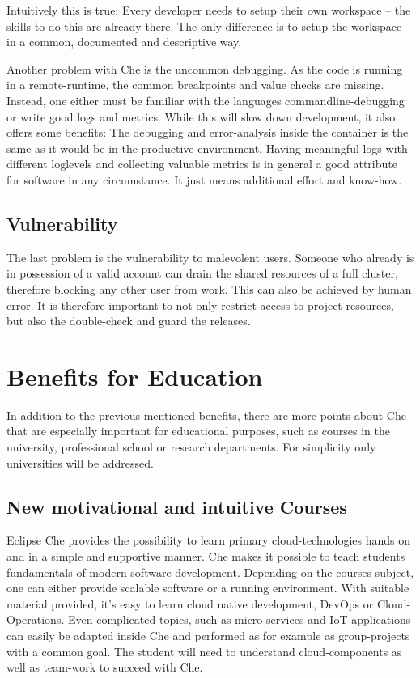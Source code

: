 \documentclass[english,utf8]{lni}
\begin{document}
Intuitively this is true: Every developer needs to setup their own workspace – the skills to do this are already there. 
The only difference is to setup the workspace in a common, documented and descriptive way. 

Another problem with Che is the uncommon debugging. 
As the code is running in a remote-runtime, the common breakpoints  and  value checks are missing.  
Instead,  one  either must be familiar with the languages commandline-debugging or write good logs and metrics. 
While this will slow down development, it also offers some benefits: 
The debugging and error-analysis inside the container is the same as it would be in the productive environment. 
Having meaningful logs with different loglevels and collecting valuable metrics is in general a good attribute for software in any circumstance. 
It just means additional effort and know-how.  

\subsection{Vulnerability}
The last problem is the vulnerability to malevolent users. 
Someone who already is in possession of a valid account can drain the shared resources of a full cluster, therefore blocking  any  other  user  from  work.
This  can  also  be achieved by human error. 
It is therefore important to not only restrict access to project resources, but also the double-check and guard the releases.
\section{Benefits for Education}
\label{sec:EvalEdu}
In addition to the previous mentioned benefits, there are more points about Che that are especially important for educational purposes, such as courses in the university, professional school or research departments.
For simplicity only universities will be addressed.
\subsection{New motivational and intuitive Courses}
Eclipse Che provides the possibility to learn primary cloud-technologies hands on and in a simple and supportive manner. 
Che makes it possible to teach students fundamentals of modern software development.
Depending on the courses subject, one can either provide scalable software or a running environment. 
With suitable material provided, it's easy to learn cloud native development, DevOps or Cloud-Operations. 
Even complicated topics, such as micro-services and IoT-applications can easily be adapted inside Che \cite{IV18} and performed as for example as group-projects with a common goal. 
The student will need to understand cloud-components as well as team-work to succeed with Che. 
\end{document}
